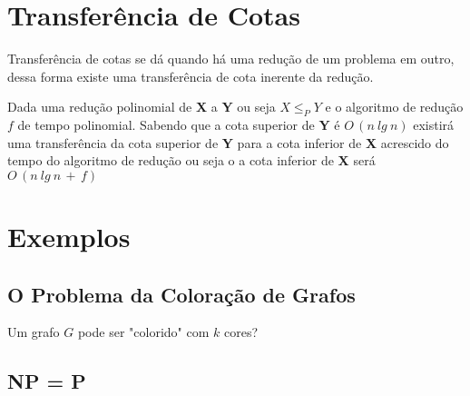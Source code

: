 \documentclass[12pt,a4papper]{article}
\begin{document}
\section{Transferência de Cotas}
Transferência de cotas se dá quando há uma redução de um problema em outro, dessa forma existe uma transferência de cota inerente da redução.

Dada uma redução polinomial de \textbf{X} a \textbf{Y} ou seja $X \leq_P Y$ e o algoritmo de redução $f$ de tempo polinomial. Sabendo que a cota superior de \textbf{Y} é $O\,(n\:lg\:n)$ existirá uma transferência da cota superior de \textbf{Y} para a cota inferior de \textbf{X} acrescido do tempo do algoritmo de redução ou seja o a cota inferior de \textbf{X} será $O\,(n\:lg\:n\, + \,f)$

\section{Exemplos}


\subsection{O Problema da Coloração de Grafos}
Um grafo $G$ pode ser "colorido" com $k$ cores?

\subsection{NP = P}
\end{document}

